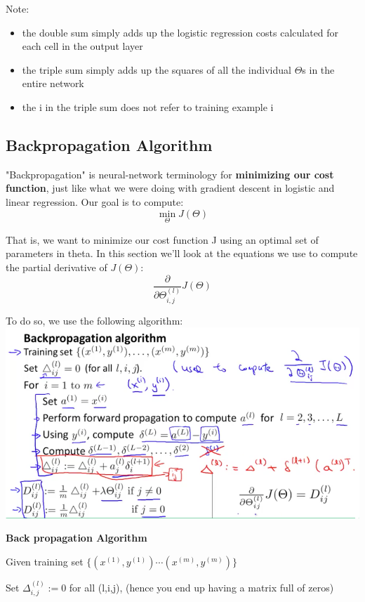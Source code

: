 \documentclass{article}
\begin{document}
Note:
\begin{itemize}
	\item the double sum simply adds up the logistic regression costs calculated for each cell in the output layer
	\item the triple sum simply adds up the squares of all the individual $\Theta$s in the entire network
	\item the i in the triple sum does not refer to training example i
\end{itemize}

\subsection{Backpropagation Algorithm}
"Backpropagation" is neural-network terminology for \textbf{minimizing our cost function}, just like what we were doing with gradient descent in logistic and linear regression. Our goal is to compute:
$$\min_\Theta J(\Theta)$$

That is, we want to minimize our cost function J using an optimal set of parameters in theta. In this section we'll look at the equations we use to compute the partial derivative of $J(\Theta)$:
$$\dfrac{\partial}{\partial \Theta_{i,j}^{(l)}}J(\Theta)$$

To do so, we use the following algorithm:\\
\includegraphics[width=\textwidth]{Backpropagation_Algorithm.png}

\noindent\textbf{Back propagation Algorithm}

Given training set $\lbrace (x^{(1)}, y^{(1)}) \cdots (x^{(m)}, y^{(m)})\rbrace$

Set $\Delta^{(l)}_{i,j} := 0$ for all (l,i,j), (hence you end up having a matrix full of zeros)
\end{document}
